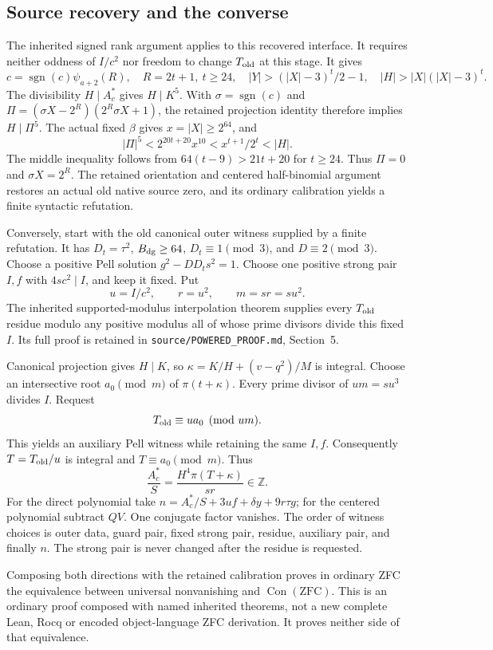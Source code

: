 \subsection{Source recovery and the converse}

The inherited signed rank argument applies to this recovered interface.
It requires neither oddness of $I/c^2$ nor freedom to change
$T_{\rm old}$ at this stage. It gives
\[
 c=\operatorname{sgn}(c)\psi_{a+2}(R),\quad
 R=2t+1,\ t\ge24,\quad
 |Y|>(|X|-3)^t/2-1,\quad |H|>|X|(|X|-3)^t.
\]
The divisibility $H\mid A_c^{\ast}$ gives $H\mid K^5$.
With $\sigma=\operatorname{sgn}(c)$ and
$\Pi=(\sigma X-2^R)(2^R\sigma X+1)$, the retained projection identity
therefore implies $H\mid\Pi^5$. The actual fixed $\beta$ gives
$x=|X|\ge2^{64}$, and
\[
 |\Pi|^5<2^{20t+20}x^{10}<x^{t+1}/2^t<|H|.
\]
The middle inequality follows from $64(t-9)>21t+20$ for $t\ge24$.
Thus $\Pi=0$ and $\sigma X=2^R$. The retained orientation and
centered half-binomial argument restores an actual old native source
zero, and its ordinary calibration yields a finite syntactic refutation.

Conversely, start with the old canonical outer witness supplied by a
finite refutation. It has $D_t=\tau^2$, $B_{\rm dg}\ge64$,
$D_t\equiv1\pmod3$, and $D\equiv2\pmod3$.
Choose a positive Pell solution $g^2-DD_ts^2=1$.
Choose one positive strong pair $I,f$ with $4sc^2\mid I$, and keep it
fixed. Put
\[
 u=I/c^2,\qquad r=u^2,\qquad m=sr=su^2.
\]
The inherited supported-modulus interpolation theorem supplies every
$T_{\rm old}$ residue modulo any positive modulus all of whose prime
divisors divide this fixed $I$. Its full proof is retained in
\texttt{source/POWERED\_PROOF.md}, Section~5.

Canonical projection gives $H\mid K$, so
$\kappa=K/H+(v-q^2)/M$ is integral. Choose an intersective root
$a_0\pmod m$ of $\pi(t+\kappa)$. Every prime divisor of $um=su^3$
divides $I$. Request
\[
 T_{\rm old}\equiv ua_0\pmod{um}.
\]
This yields an auxiliary Pell witness while retaining the same $I,f$.
Consequently $T=T_{\rm old}/u$ is integral and $T\equiv a_0\pmod m$.
Thus
\[
 \frac{A_c^{\ast}}S=\frac{H^4\pi(T+\kappa)}{sr}\in\mathbb Z.
\]
For the direct polynomial take
$n=A_c^{\ast}/S+3uf+\delta y+9r\tau g$; for the centered polynomial
subtract $QV$. One conjugate factor vanishes. The order of witness
choices is outer data, guard pair, fixed strong pair, residue,
auxiliary pair, and finally $n$. The strong pair is never changed after
the residue is requested.

Composing both directions with the retained calibration proves in
ordinary ZFC the equivalence between universal nonvanishing and
$\operatorname{Con}(\mathrm{ZFC})$. This is an ordinary proof composed
with named inherited theorems, not a new complete Lean, Rocq or encoded
object-language ZFC derivation. It proves neither side of that equivalence.

